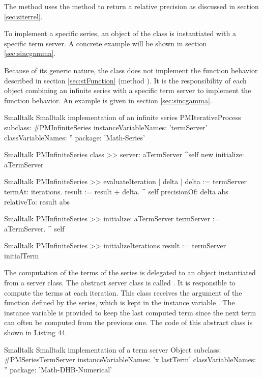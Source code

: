 The method  uses the method  to return a relative precision as discussed in section \ref{sec:siterrel}.

To implement a specific series, an object of the class  is instantiated with a specific term server. A concrete example will be shown in section \ref{sec:sincgamma}.

Because of its generic nature, the class 
does not implement the function behavior described in section
\ref{sec:stFunction} (method ).
It is the responsibility of each object combining an infinite series with a
specific term server to implement the function behavior.
An example is given in section \ref{sec:sincgamma}.

\begin{listing}[label=lst:infseries]{Smalltalk}
{Smalltalk implementation of an infinite series}
PMIterativeProcess subclass: #PMInfiniteSeries
   instanceVariableNames: 'termServer'
   classVariableNames: ''
   package: 'Math-Series'
\end{listing}

\begin{displaycode}{Smalltalk}
PMInfiniteSeries class >> server: aTermServer
    ^self new initialize: aTermServer
\end{displaycode}

\begin{displaycode}{Smalltalk}
PMInfiniteSeries >> evaluateIteration
    | delta |
    delta := termServer termAt: iterations.
    result := result + delta.
    ^ self precisionOf: delta abs relativeTo: result abs
\end{displaycode}

\begin{displaycode}{Smalltalk}
PMInfiniteSeries >> initialize: aTermServer
    termServer := aTermServer.
    ^ self
\end{displaycode}

\begin{displaycode}{Smalltalk}
PMInfiniteSeries >> initializeIterations
    result := termServer initialTerm
\end{displaycode}

The computation of the terms of the series is delegated to an
object instantiated from a server class. The abstract server class
is called . It is responsible to
compute the terms at each iteration. This class receives the
argument of the function defined by the series, which is kept in
the instance variable .
The instance variable  is provided to keep the last computed term since the next term can often be computed from the previous one.
The code of this abstract class is shown in Listing 44.
\begin{listing}[label=lst:termserver]{Smalltalk}
{Smalltalk implementation of a term server}
Object subclass: #PMSeriesTermServer
   instanceVariableNames: 'x lastTerm'
   classVariableNames: ''
   package: 'Math-DHB-Numerical'
\end{listing}

